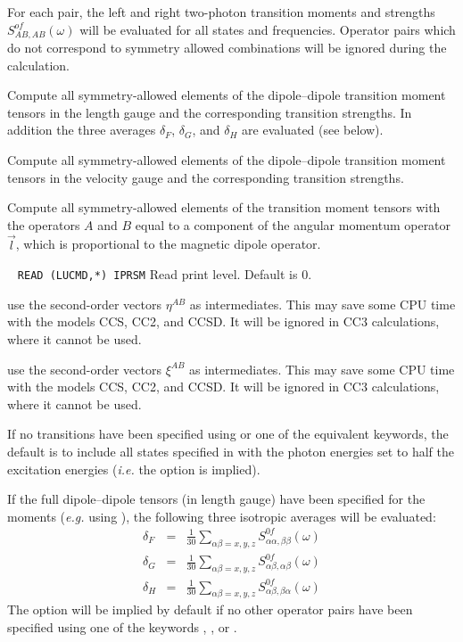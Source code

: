 \begin{description}
For each pair, the left and right two-photon transition moments
and strengths $S^{of}_{AB,AB}(\omega)$ will be evaluated 
for all states and frequencies.
Operator pairs which do not correspond to symmetry allowed
combinations will be ignored during the calculation.
%
\item[\Key{DIPLEN}] 
Compute all symmetry-allowed elements of the dipole--dipole 
transition moment tensors in the length gauge
and the corresponding transition strengths.
In addition the three averages $\delta_F$, $\delta_G$, and $\delta_H$
are evaluated (see below).
%
\item[\Key{DIPVEL}]
Compute all symmetry-allowed elements of the dipole--dipole 
transition moment tensors in the velocity gauge
and the corresponding transition strengths.
%
\item[\Key{ANGMOM}]
Compute all symmetry-allowed elements of 
the transition moment tensors
with the operators $A$ and $B$ equal to 
a component of the angular momentum operator $\vec{l}$,
which is proportional to the magnetic dipole operator.
%
\item[\Key{PRINT}] \verb| |\newline
\verb|READ (LUCMD,*) IPRSM|\newline
Read print level. Default is 0.
%
\item[\Key{USE X2}] use the second-order vectors $\eta^{AB}$ as intermediates.
   This may save some CPU time with the models CCS, CC2, and CCSD.
   It will be ignored in CC3 calculations, where it cannot be used. 
%
\item[\Key{USE O2}] use the second-order vectors $\xi^{AB}$ as intermediates.
   This may save some CPU time with the models CCS, CC2, and CCSD.
   It will be ignored in CC3 calculations, where it cannot be used. 
\end{description}
If no transitions have been specified using  or one
of the equivalent keywords, the default is to include all 
states specified in  with the photon energies
set to half the excitation energies 
({\it i.e.\/} the  option is implied).

If the full dipole--dipole tensors (in length gauge) have been specified for the
moments ({\it e.g.\/} using ), the following three isotropic averages will be
evaluated:
\begin{eqnarray*}
  \delta_F & = & \frac{1}{30} 
   \sum_{\alpha\beta=x,y,z} S^{0f}_{\alpha\alpha,\beta\beta}(\omega)
\\
  \delta_G & = & \frac{1}{30} 
   \sum_{\alpha\beta=x,y,z} S^{0f}_{\alpha\beta,\alpha\beta}(\omega)
\\
  \delta_H & = & \frac{1}{30} 
   \sum_{\alpha\beta=x,y,z} S^{0f}_{\alpha\beta,\beta\alpha}(\omega)
\end{eqnarray*}
The option  will be implied by default if no other
operator pairs have been specified using one of the keywords
, , or .

